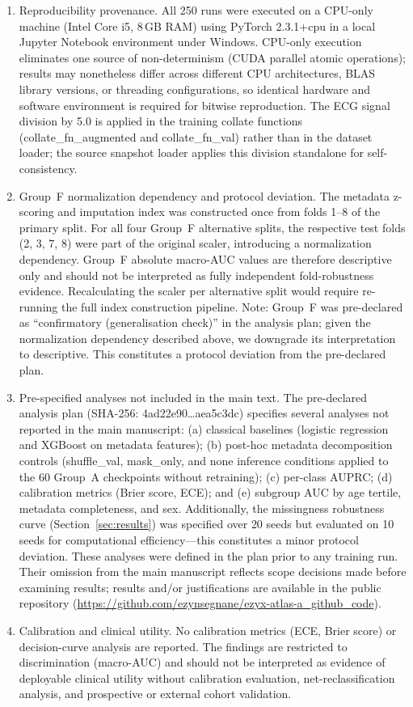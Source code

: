 \documentclass[mathematics,article,submit,pdftex]{Definitions/mdpi}
\def\texttt#1{#1}%
\def\textbf#1{#1}%
\def\emph#1{#1}%
\begin{document}
\begin{enumerate}[leftmargin=1.4em]
    \item \textbf{Reproducibility provenance.} All 250 runs were executed on a CPU-only machine (Intel Core i5, 8\,GB RAM) using PyTorch 2.3.1+cpu in a local Jupyter Notebook environment under Windows. CPU-only execution eliminates one source of non-determinism (CUDA parallel atomic operations); results may nonetheless differ across different CPU architectures, BLAS library versions, or threading configurations, so identical hardware and software environment is required for bitwise reproduction. The ECG signal division by 5.0 is applied in the training collate functions (\texttt{collate\_fn\_augmented} and \texttt{collate\_fn\_val}) rather than in the dataset loader; the source snapshot loader applies this division standalone for self-consistency.
    \item \textbf{Group~F normalization dependency and protocol deviation.} The metadata z-scoring and imputation index was constructed once from folds 1--8 of the primary split. For all four Group~F alternative splits, the respective test folds (2, 3, 7, 8) were part of the original scaler, introducing a normalization dependency. Group~F absolute macro-AUC values are therefore descriptive only and should not be interpreted as fully independent fold-robustness evidence. Recalculating the scaler per alternative split would require re-running the full index construction pipeline. \emph{Note}: Group~F was pre-declared as ``confirmatory (generalisation check)'' in the analysis plan; given the normalization dependency described above, we downgrade its interpretation to descriptive. This constitutes a protocol deviation from the pre-declared plan.
    \item \textbf{Pre-specified analyses not included in the main text.} The pre-declared analysis plan (SHA-256: \texttt{4ad22e90\ldots aea5c3dc}) specifies several analyses not reported in the main manuscript: (a) classical baselines (logistic regression and XGBoost on metadata features); (b) post-hoc metadata decomposition controls (\texttt{shuffle\_val}, \texttt{mask\_only}, and \texttt{none} inference conditions applied to the 60 Group~A checkpoints without retraining); (c) per-class AUPRC; (d) calibration metrics (Brier score, ECE); and (e) subgroup AUC by age tertile, metadata completeness, and sex. Additionally, the missingness robustness curve (Section~\ref{sec:results}) was specified over 20 seeds but evaluated on 10 seeds for computational efficiency---this constitutes a minor protocol deviation. These analyses were defined in the plan prior to any training run. Their omission from the main manuscript reflects scope decisions made before examining results; results and/or justifications are available in the public repository (\url{https://github.com/ezynsegnane/ezyx-atlas-a_github_code}).
    \item \textbf{Calibration and clinical utility.} No calibration metrics (ECE, Brier score) or decision-curve analysis are reported. The findings are restricted to discrimination (macro-AUC) and should not be interpreted as evidence of deployable clinical utility without calibration evaluation, net-reclassification analysis, and prospective or external cohort validation.
\end{enumerate}
\end{document}

